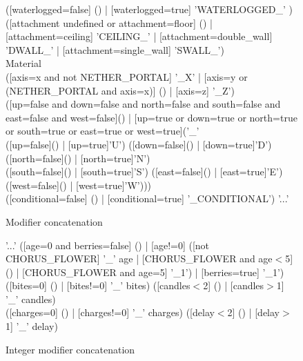 \documentclass[11pt]{article}
\begin{document}
\begin{subfigures}
\begin{figure}
	\begin{rail}
		([waterlogged=false] () | [waterlogged=true] 'WATERLOGGED\_' ) %
		([attachment undefined or attachment=floor] () | [attachment=ceiling] 'CEILING\_' | [attachment=double\_wall] 'DWALL\_' | [attachment=single\_wall] 'SWALL\_') \\
		Material \\
		([axis=x and not NETHER\_PORTAL] '\_X' | [axis=y or (NETHER\_PORTAL and axis=x)] () | [axis=z] '\_Z') \\
		([up=false and down=false and north=false and south=false and east=false and west=false]() | [up=true or down=true or north=true or south=true or east=true or west=true]('\_' \\ ([up=false]() | [up=true]'U') ([down=false]() | [down=true]'D') ([north=false]() | [north=true]'N') \\ ([south=false]() | [south=true]'S') ([east=false]() | [east=true]'E') ([west=false]() | [west=true]'W'))) \\
		([conditional=false] () | [conditional=true] '\_CONDITIONAL')
		'...'
	\end{rail}
	\label{rail:modifier-concatenation}
	\caption{Modifier concatenation}
\end{figure}

\begin{figure}
	\begin{rail}
		'...'
		([age=0 and berries=false] () | [age!=0] ([not CHORUS\_FLOWER] '\_' age | [CHORUS\_FLOWER and age$<$5] () | [CHORUS\_FLOWER and age=5] '\_1') | [berries=true] '\_1') \\
		([bites=0] () | [bites!=0] '\_' bites) ([candles$<$2] () | [candles$>$1] '\_' candles) \\
		([charges=0] () | [charges!=0] '\_' charges) ([delay$<$2] () | [delay$>$1] '\_' delay)
	\end{rail}
	\caption{Integer modifier concatenation}
\end{figure}
\end{subfigures}



	
\end{document}
